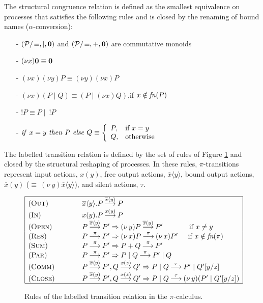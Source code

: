 \documentclass[10pt,a4paper,final,oneside,fleqn]{book}
\newcommand*{\todefoutpi}{\mathbin{\mathop{\longrightarrow}\limits^{\overline{x}\langle y\rangle}}}
\newcommand*{\todefoutbpi}{\mathbin{\mathop{\longrightarrow}\limits^{\overline{x}{(}y{)}}}}
\newcommand*{\todefinpi}{\mathbin{\mathop{\longrightarrow}\limits^{x(y)}}}
\newcommand*{\todefinzpi}{\mathbin{\mathop{\longrightarrow}\limits^{x(z)}}}
\newcommand*{\todeftaupi}{\mathbin{\mathop{\longrightarrow}\limits^{\tau}}}
\newcommand*{\todefpipi}{\mathbin{\mathop{\longrightarrow}\limits^{\pi}}}
\begin{document}
The structural congruence relation is defined as the smallest equivalence on processes that satisfies the following rules and is closed by the renaming of bound names ($\alpha$-conversion):
\begin{itemize}
\item[-]
$(\mathcal{P}/\!\equiv,\mid,{\bf 0})$ and $(\mathcal{P}/\!\equiv,+,{\bf 0})$ are commutative monoids
\item[-]
$(\nu x){\bf 0}\equiv{\bf 0}$
\item[-]
$(\nu x)(\nu y)P\equiv(\nu y)(\nu x)P$
\item[-]
$(\nu x)(P\mid Q)\equiv(P\mid(\nu x)Q)$,\hspace{8mm}if $x\notin\mbox{{\itshape fn\/}}(P)$

\item[-]
$!P\equiv P\mid~!P$
\item[-]
$\mbox{{\itshape if\/} }x=y\mbox{ {\itshape then\/} }P\mbox{ {\itshape else\/} }Q\equiv\left\{\begin{array}{ll}P,&\mbox{if }x=y\\Q,&\mbox{otherwise}\end{array}\right.$
\end{itemize}
The labelled transition relation is defined by the set of rules of Figure \ref{sospi} and closed by the structural reshaping of processes. In these rules, $\pi$-transitions represent input actions, $x(y)$, free output actions, $\overline{x}\langle y\rangle$, bound output actions, $\overline{x}(y)$ ($\equiv~(\nu~\!y)\overline{x}\langle y\rangle$), and silent actions, $\tau$.
\begin{figure}[bht]
\begin{center}
$\begin{array}{|ll|}\hline
(\textsc{Out})\hspace{10mm}&\overline{x}\langle y\rangle.P\todefoutpi P\\
(\textsc{In})\hspace{10mm}&x(y).P\todefinpi P\\
(\textsc{Open})&P\todefoutpi P'\Rightarrow (\nu~\!y)P\todefoutbpi P'\hspace{13mm}\mbox{if }x\ne y\\
(\textsc{Res})&P\todefpipi P'\Rightarrow (\nu~\!x)P\todefpipi (\nu~\!x)P'\hspace{5mm}\mbox{if }x\notin\mbox{{\itshape fn}}(\pi)\\
(\textsc{Sum})&P\todefpipi P'\Rightarrow P+Q\todefpipi P'\\
(\textsc{Par})&P\todefpipi P'\Rightarrow P\mid Q\todefpipi P'\mid Q\\
(\textsc{Comm})\hspace{10mm}&P\todefoutpi P',Q\todefinzpi Q'\Rightarrow P\mid Q\todeftaupi P'\mid Q'[y/z]\\
(\textsc{Close})\hspace{10mm}&P\todefoutbpi P',Q\todefinzpi Q'\Rightarrow P\mid Q\todeftaupi (\nu~\!y)(P'\mid Q'[y/z])\\
\hline
\end{array}$
\end{center}
\caption{Rules of the labelled transition relation in the $\pi$-calculus.\label{sospi}}
\end{figure}
\end{document}
